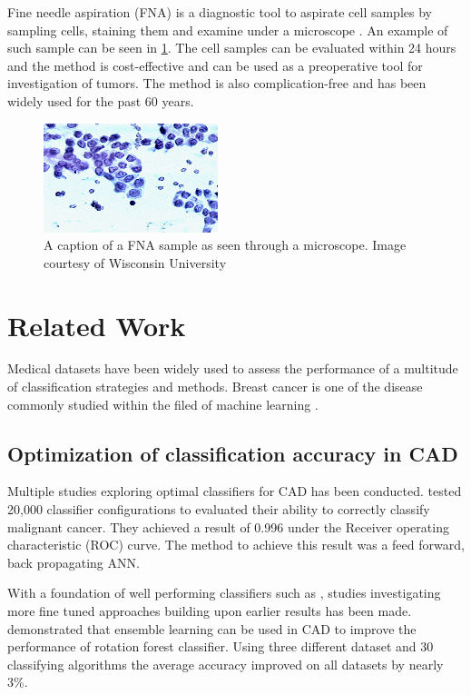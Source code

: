 Fine needle aspiration (FNA) is a diagnostic tool to aspirate cell samples by sampling cells, staining them and examine under a microscope \parencite{FNA}. An example of such sample can be seen in \ref{fig:fna_nuclei}. The cell samples can be evaluated within 24 hours and the method is cost-effective and can be used as a preoperative tool for investigation of tumors. The method is also complication-free and has been widely used for the past 60 years.

\begin{figure}[ht!]
  \centering
  \includegraphics[]{images/fna_nuclei.png}
  \caption{A caption of a FNA sample as seen through a microscope. Image courtesy of Wisconsin University}
  \label{fig:fna_nuclei}
\end{figure}



\section{Related Work}

Medical datasets have been widely used to assess the performance of a multitude of classification strategies and methods. Breast cancer is one of the disease commonly studied within the filed of machine learning \parencite{kononenko2001}.

\subsection{Optimization of classification accuracy in CAD}

Multiple studies exploring optimal classifiers for CAD has been conducted. \textcite{ramos2012} tested 20,000 classifier configurations to evaluated their ability to correctly classify malignant cancer. They achieved a result of 0.996 under the Receiver operating characteristic (ROC) curve. The method to achieve this result was a feed forward, back propagating ANN.

With a foundation of well performing classifiers such as \parencite{ramos2012}, studies investigating more fine tuned approaches building upon earlier results has been made. \textcite{akin2011} demonstrated that ensemble learning can be used in CAD to improve the performance of rotation forest classifier. Using three different dataset and 30 classifying algorithms the average accuracy improved on all datasets by nearly 3\%.

